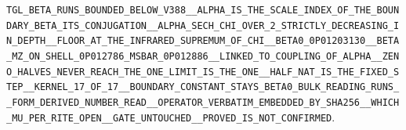 \documentclass[11pt]{article}
\theoremstyle{definition}\newtheorem{deriv}{Derivation}
\begin{document}
\texttt{TGL\_\allowbreak{}BETA\_\allowbreak{}RUNS\_\allowbreak{}BOUNDED\_\allowbreak{}BELOW\_\allowbreak{}V388\_\allowbreak{}\_\allowbreak{}ALPHA\_\allowbreak{}IS\_\allowbreak{}THE\_\allowbreak{}SCALE\_\allowbreak{}INDEX\_\allowbreak{}OF\_\allowbreak{}THE\_\allowbreak{}BOUNDARY\_\allowbreak{}BETA\_\allowbreak{}ITS\_\allowbreak{}CONJUGATION\_\allowbreak{}\_\allowbreak{}ALPHA\_\allowbreak{}SECH\_\allowbreak{}CHI\_\allowbreak{}OVER\_\allowbreak{}2\_\allowbreak{}STRICTLY\_\allowbreak{}DECREASING\_\allowbreak{}IN\_\allowbreak{}DEPTH\_\allowbreak{}\_\allowbreak{}FLOOR\_\allowbreak{}AT\_\allowbreak{}THE\_\allowbreak{}INFRARED\_\allowbreak{}SUPREMUM\_\allowbreak{}OF\_\allowbreak{}CHI\_\allowbreak{}\_\allowbreak{}BETA0\_\allowbreak{}0P01203130\_\allowbreak{}\_\allowbreak{}BETA\_\allowbreak{}MZ\_\allowbreak{}ON\_\allowbreak{}SHELL\_\allowbreak{}0P012786\_\allowbreak{}MSBAR\_\allowbreak{}0P012886\_\allowbreak{}\_\allowbreak{}LINKED\_\allowbreak{}TO\_\allowbreak{}COUPLING\_\allowbreak{}OF\_\allowbreak{}ALPHA\_\allowbreak{}\_\allowbreak{}ZENO\_\allowbreak{}HALVES\_\allowbreak{}NEVER\_\allowbreak{}REACH\_\allowbreak{}THE\_\allowbreak{}ONE\_\allowbreak{}LIMIT\_\allowbreak{}IS\_\allowbreak{}THE\_\allowbreak{}ONE\_\allowbreak{}\_\allowbreak{}HALF\_\allowbreak{}NAT\_\allowbreak{}IS\_\allowbreak{}THE\_\allowbreak{}FIXED\_\allowbreak{}STEP\_\allowbreak{}\_\allowbreak{}KERNEL\_\allowbreak{}17\_\allowbreak{}OF\_\allowbreak{}17\_\allowbreak{}\_\allowbreak{}BOUNDARY\_\allowbreak{}CONSTANT\_\allowbreak{}STAYS\_\allowbreak{}BETA0\_\allowbreak{}BULK\_\allowbreak{}READING\_\allowbreak{}RUNS\_\allowbreak{}\_\allowbreak{}FORM\_\allowbreak{}DERIVED\_\allowbreak{}NUMBER\_\allowbreak{}READ\_\allowbreak{}\_\allowbreak{}OPERATOR\_\allowbreak{}VERBATIM\_\allowbreak{}EMBEDDED\_\allowbreak{}BY\_\allowbreak{}SHA256\_\allowbreak{}\_\allowbreak{}WHICH\_\allowbreak{}MU\_\allowbreak{}PER\_\allowbreak{}RITE\_\allowbreak{}OPEN\_\allowbreak{}\_\allowbreak{}GATE\_\allowbreak{}UNTOUCHED\_\allowbreak{}\_\allowbreak{}PROVED\_\allowbreak{}IS\_\allowbreak{}NOT\_\allowbreak{}CONFIRMED}.
\end{document}
